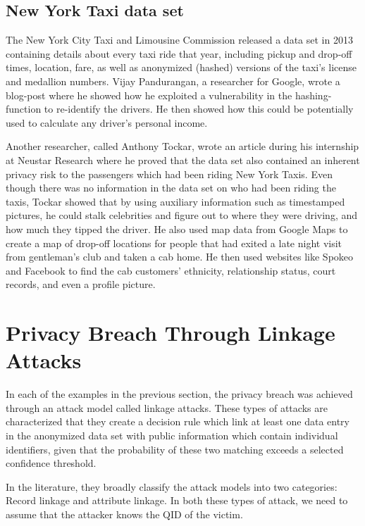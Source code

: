 \subsection{New York Taxi data set} 
The New York City Taxi and Limousine Commission released a data set in 2013 containing details about every taxi ride that year, including pickup and drop-off times, location, fare, as well as anonymized (hashed) versions of the taxi's license and medallion numbers. Vijay Pandurangan, a researcher for Google, wrote a blog-post where he showed how he exploited a vulnerability in the hashing-function to re-identify the drivers. He then showed how this could be potentially used to calculate any driver's personal income\citep{vijay2014online}. 

Another researcher, called Anthony Tockar, wrote an article during his internship at Neustar Research where he proved that the data set also contained an inherent privacy risk to the passengers which had been riding New York Taxis. Even though there was no information in the data set on who had been riding the taxis, Tockar showed that by using auxiliary information such as timestamped pictures, he could stalk celebrities and figure out to where they were driving, and how much they tipped the driver. He also used map data from Google Maps to create a map of drop-off locations for people that had exited a late night visit from gentleman's club and taken a cab home. He then used websites like Spokeo and Facebook to find the cab customers' ethnicity, relationship status, court records, and even a profile picture\citep{tockar2014online}.

\section{Privacy Breach Through Linkage Attacks}
\label{sec:attack_vectors}
In each of the examples in the previous section, the privacy breach was achieved through an attack model called linkage attacks. These types of attacks are characterized that they create a decision rule which link at least one data entry in the anonymized data set with public information which contain individual identifiers, given that the probability of these two matching exceeds a selected confidence threshold. 

In the literature\citep{bonchi2010privacybook,fung2010privacybook}, they broadly classify the attack models into two categories: Record linkage and attribute linkage. In both these types of attack, we need to assume that the attacker knows the QID of the victim.

